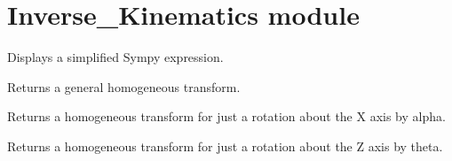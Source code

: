 \documentclass[letterpaper,10pt,english,openany,oneside]{sphinxmanual}
\begin{document}
\chapter{Inverse\_Kinematics module}
\label{\detokenize{Inverse_Kinematics::doc}}\label{\detokenize{Inverse_Kinematics:module-Inverse_Kinematics}}\label{\detokenize{Inverse_Kinematics:inverse-kinematics-module}}

\begin{fulllineitems}
\label{\detokenize{Inverse_Kinematics:Inverse_Kinematics.disp}}
Displays a simplified Sympy expression.

\end{fulllineitems}


\begin{fulllineitems}
\label{\detokenize{Inverse_Kinematics:Inverse_Kinematics.h_T}}
Returns a general homogeneous transform.

\end{fulllineitems}


\begin{fulllineitems}
\label{\detokenize{Inverse_Kinematics:Inverse_Kinematics.rot_x}}
Returns a homogeneous transform for just a rotation about the X axis by alpha.

\end{fulllineitems}


\begin{fulllineitems}
\label{\detokenize{Inverse_Kinematics:Inverse_Kinematics.rot_z}}
Returns a homogeneous transform for just a rotation about the Z axis by theta.

\end{fulllineitems}
\end{document}
